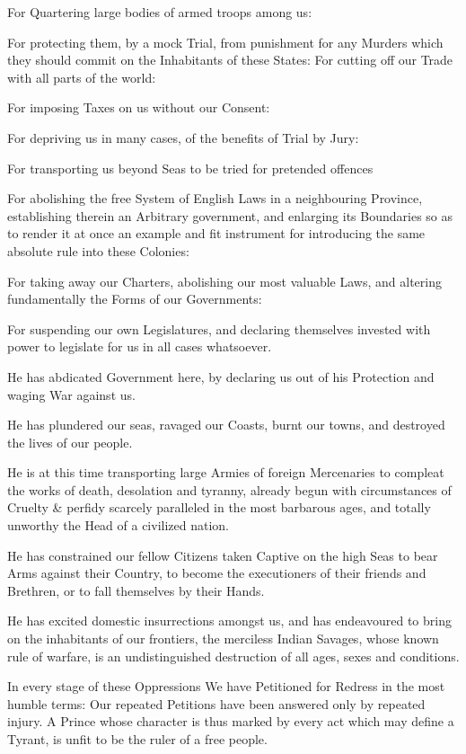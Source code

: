 For Quartering large bodies of armed troops among us:

For protecting them, by a mock Trial, from punishment for any Murders
which they should commit on the Inhabitants of these States: For
cutting off our Trade with all parts of the world:

For imposing Taxes on us without our Consent:

For depriving us in many cases, of the benefits of Trial by Jury:

For transporting us beyond Seas to be tried for pretended offences

For abolishing the free System of English Laws in a neighbouring
Province, establishing therein an Arbitrary government, and enlarging
its Boundaries so as to render it at once an example and fit
instrument for introducing the same absolute rule into these
Colonies:

For taking away our Charters, abolishing our most valuable Laws, and
altering fundamentally the Forms of our Governments:

For suspending our own Legislatures, and declaring themselves invested
with power to legislate for us in all cases whatsoever.

He has abdicated Government here, by declaring us out of his
Protection and waging War against us.

He has plundered our seas, ravaged our Coasts, burnt our towns, and
destroyed the lives of our people.

He is at this time transporting large Armies of foreign Mercenaries to
compleat the works of death, desolation and tyranny, already begun
with circumstances of Cruelty \& perfidy scarcely paralleled in the
most barbarous ages, and totally unworthy the Head of a civilized
nation.

He has constrained our fellow Citizens taken Captive on the high Seas
to bear Arms against their Country, to become the executioners of
their friends and Brethren, or to fall themselves by their Hands.

He has excited domestic insurrections amongst us, and has endeavoured
to bring on the inhabitants of our frontiers, the merciless Indian
Savages, whose known rule of warfare, is an undistinguished
destruction of all ages, sexes and conditions.

In every stage of these Oppressions We have Petitioned for Redress in
the most humble terms: Our repeated Petitions have been answered only
by repeated injury. A Prince whose character is thus marked by every
act which may define a Tyrant, is unfit to be the ruler of a free
people.

